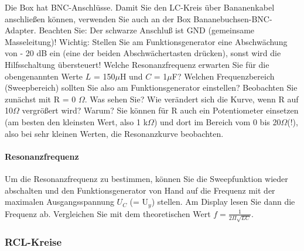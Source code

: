 \documentclass[12pt]{scrartcl}
\begin{document}

Die Box hat BNC-Anschlüsse. Damit Sie den LC-Kreis über Bananenkabel anschließen können, verwenden Sie auch an der Box Bananebuchsen-BNC-Adapter. Beachten Sie: Der schwarze Anschluß ist GND (gemeinsame
Masseleitung)! Wichtig: Stellen Sie am Funktionsgenerator eine Abschwächung von - 20 dB ein (eine der beiden Abschwächertasten drücken), sonst wird die Hilfsschaltung übersteuert! Welche Resonanzfrequenz erwarten Sie für die obengenannten Werte
$L$ = 150$\mu$H und $C$ = 1$\mu$F? Welchen Frequenzbereich (Sweepbereich) sollten Sie also am Funktionsgenerator einstellen?
Beobachten Sie zunächst mit R = 0
$\Omega$. Was sehen Sie? Wie verändert sich die Kurve, wenn R auf 10$\Omega$ vergrößert wird? Warum? Sie können für R auch ein Potentiometer einsetzen (am besten den kleinsten Wert, also 1 k$\Omega$) und dort im Bereich vom 0 bis 20$\Omega$(!), also bei sehr kleinen Werten, die Resonanzkurve beobachten.
\paragraph{Resonanzfrequenz}
Um die Resonanzfrequenz zu bestimmen, können Sie die Sweepfunktion wieder abschalten und den Funktionsgenerator von Hand auf die Frequenz mit der maximalen Ausgangsspannung
$U_C$ (= U$_y$) stellen. Am Display lesen Sie dann die Frequenz ab. Vergleichen Sie mit dem theoretischen Wert
$f = \frac{1}{2 \Pi \sqrt{LC}}$.
\subsubsection{RCL-Kreise}
\end{document}
